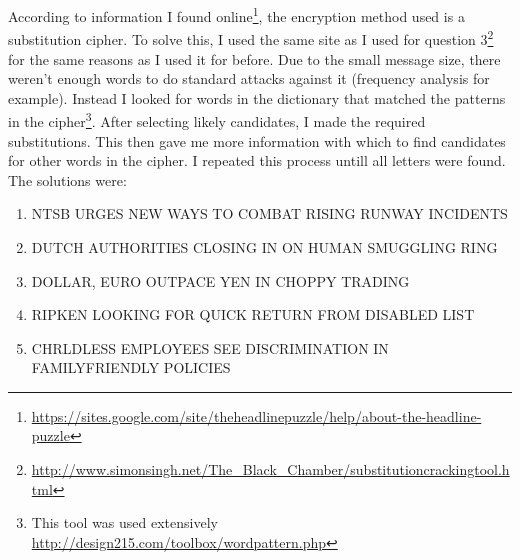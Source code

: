 \documentclass[12pt]{article}
\begin{document}
According to information I found online\footnote{\url{https://sites.google.com/site/theheadlinepuzzle/help/about-the-headline-puzzle}}, the encryption method used is a substitution cipher. To solve this, I used the same site as I used for question 3\footnote{\url{http://www.simonsingh.net/The_Black_Chamber/substitutioncrackingtool.html}} for the same reasons as I used it for before. Due to the small message size, there weren't enough words to do standard attacks against it (frequency analysis for example). Instead I looked for words in the dictionary that matched the patterns in the cipher\footnote{This tool was used extensively \url{http://design215.com/toolbox/wordpattern.php}}. After selecting likely candidates, I made the required substitutions. This then gave me more information with which to find candidates for other words in the cipher. I repeated this process untill all letters were found. The solutions were:
\begin{enumerate}
\item NTSB URGES NEW WAYS TO COMBAT RISING RUNWAY INCIDENTS
\item DUTCH AUTHORITIES CLOSING IN ON HUMAN SMUGGLING RING
\item DOLLAR, EURO OUTPACE YEN IN CHOPPY TRADING
\item RIPKEN LOOKING FOR QUICK RETURN FROM DISABLED LIST
\item CHRLDLESS EMPLOYEES SEE DISCRIMINATION IN FAMILYFRIENDLY POLICIES
\end{enumerate}
\end{document}
